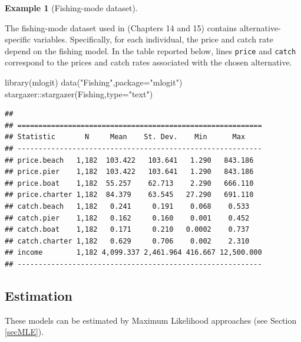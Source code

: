 \documentclass[
  12pt,
]{book}
\newenvironment{Shaded}{\begin{snugshade}}{\end{snugshade}}
\newcommand{\AttributeTok}[1]{\textcolor[rgb]{0.77,0.63,0.00}{#1}}
\newcommand{\FunctionTok}[1]{\textcolor[rgb]{0.00,0.00,0.00}{#1}}
\newcommand{\NormalTok}[1]{#1}
\newcommand{\SpecialCharTok}[1]{\textcolor[rgb]{0.00,0.00,0.00}{#1}}
\newcommand{\StringTok}[1]{\textcolor[rgb]{0.31,0.60,0.02}{#1}}
\theoremstyle{definition}
\theoremstyle{definition}
\newtheorem{example}{Example}[chapter]
\theoremstyle{definition}
\theoremstyle{definition}
\theoremstyle{remark}
\begin{document}
\begin{example}[Fishing-mode dataset]
\protect\hypertarget{exm:FishingTable}{}\label{exm:FishingTable}

The fishing-mode dataset used in \citet{Cameron_Trivedi_2005} (Chapters 14 and 15) contains alternative-specific variables. Specifically, for each individual, the price and catch rate depend on the fishing model. In the table reported below, lines \texttt{price} and \texttt{catch} correspond to the prices and catch rates associated with the chosen alternative.

\begin{Shaded}
\begin{Highlighting}[]
\FunctionTok{library}\NormalTok{(mlogit)}
\FunctionTok{data}\NormalTok{(}\StringTok{"Fishing"}\NormalTok{,}\AttributeTok{package=}\StringTok{"mlogit"}\NormalTok{)}
\NormalTok{stargazer}\SpecialCharTok{::}\FunctionTok{stargazer}\NormalTok{(Fishing,}\AttributeTok{type=}\StringTok{"text"}\NormalTok{)}
\end{Highlighting}
\end{Shaded}

\begin{verbatim}
## 
## ==========================================================
## Statistic       N     Mean    St. Dev.    Min      Max    
## ----------------------------------------------------------
## price.beach   1,182  103.422   103.641   1.290   843.186  
## price.pier    1,182  103.422   103.641   1.290   843.186  
## price.boat    1,182  55.257    62.713    2.290   666.110  
## price.charter 1,182  84.379    63.545   27.290   691.110  
## catch.beach   1,182   0.241     0.191    0.068    0.533   
## catch.pier    1,182   0.162     0.160    0.001    0.452   
## catch.boat    1,182   0.171     0.210   0.0002    0.737   
## catch.charter 1,182   0.629     0.706    0.002    2.310   
## income        1,182 4,099.337 2,461.964 416.667 12,500.000
## ----------------------------------------------------------
\end{verbatim}

\end{example}

\hypertarget{estimation}{%
\subsection{Estimation}\label{estimation}}

These models can be estimated by Maximum Likelihood approaches (see Section \ref{secMLE}).
\end{document}
